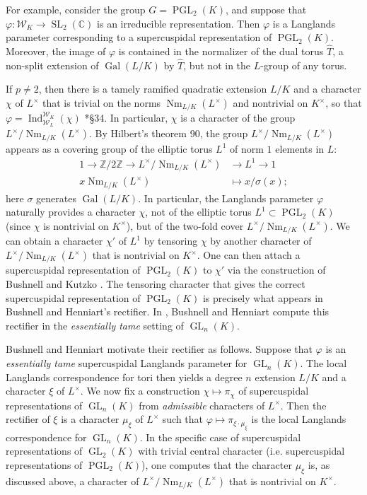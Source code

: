 \documentclass{compositio}
\theoremstyle{plain}
\theoremstyle{definition}
\numberwithin{equation}{section}
\DeclareMathOperator{\Gal}{Gal}
\DeclareMathOperator{\Nm}{Nm}
\DeclareMathOperator{\Ind}{Ind}
\DeclareMathOperator{\GL}{GL}
\DeclareMathOperator{\PGL}{PGL}
\DeclareMathOperator{\SL}{SL}
\newcommand{\CC}{\mathbb{C}}
\newcommand{\Kx}{K^\times}
\newcommand{\Lx}{L^\times}
\newcommand{\Weil}{\mathcal{W}}
\begin{document}
For example, consider the group $G = \PGL_{2}(K)$, and suppose that
$\varphi : \Weil_K \rightarrow \SL_{2}(\CC)$ is an
irreducible representation.  Then $\varphi$ is a Langlands parameter corresponding
to a supercuspidal representation of $\PGL_2(K)$.  Moreover, the image of $\varphi$
is contained in the normalizer of the dual torus $\hat{T}$, a non-split
extension of $\Gal(L/K)$ by $\hat{T}$, but not in the $L$-group of any torus.

If $p \neq 2$, then there is a tamely ramified quadratic
extension $L/K$ and a character
$\chi$ of $\Lx$ that is trivial on the norms $\Nm_{L/K}(\Lx)$ and nontrivial on $\Kx$, so that
$\varphi = \Ind_{\Weil_L}^{\Weil_K}(\chi)$ \cite{bushnell-henniart:06a}*{\S 34}.  In particular, $\chi$ is a character of the group $\Lx / \Nm_{L/K}(\Lx)$.
By Hilbert's theorem 90, the group $\Lx / \Nm_{L/K}(\Lx)$ appears as a covering group of the elliptic torus $L^1$ of norm $1$ elements in $L$:
\begin{align*}
1 \rightarrow \mathbb{Z} / 2 \mathbb{Z} \rightarrow \Lx / \Nm_{L/K}(\Lx) &\rightarrow L^1 \rightarrow 1 \\
x \Nm_{L/K}(L^{\times}) &\mapsto x / \sigma(x);
\end{align*}
here $\sigma$ generates $\Gal(L/K)$.  In particular, the Langlands parameter
$\varphi$ naturally provides a character $\chi$, not of the elliptic torus
$L^1 \subset \PGL_2(K)$ (since $\chi$ is nontrivial on $\Kx$),
but of the two-fold cover $\Lx / \Nm_{L/K}(\Lx)$.  We can obtain a character $\chi'$ of $L^1$
by tensoring $\chi$ by another character of
$\Lx / \Nm_{L/K}(\Lx)$ that is nontrivial on $\Kx$.  One can then attach a supercuspidal representation
of $\PGL_2(K)$ to $\chi'$ via the construction of Bushnell and Kutzko \cite{bushnell-kutzko:AdmissibleDual}.
The tensoring character that gives the correct supercuspidal representation of $\PGL_2(K)$
is precisely what appears in Bushnell and Henniart's rectifier.  In \cite{bushnell-henniart:10a},
Bushnell and Henniart compute this rectifier in the \emph{essentially tame} setting of $\GL_n(K)$.

Bushnell and Henniart motivate their rectifier as follows.
Suppose that $\varphi$ is an \emph{essentially tame} supercuspidal Langlands parameter for
$\GL_n(K)$.  The local Langlands correspondence for tori then yields a degree $n$ extension
$L/K$ and a character $\xi$ of $L^{\times}$.  We now fix a construction $\chi \mapsto \pi_{\chi}$
of supercuspidal representations of $\GL_n(K)$ from \emph{admissible} characters of $L^{\times}$.
Then the rectifier of $\xi$ is a character $\mu_{\xi}$ of $L^{\times}$ such that
$\varphi \mapsto \pi_{\xi \cdot \mu_{\xi}}$ is the local Langlands correspondence for $\GL_n(K)$.
In the specific case of supercuspidal representations of $\GL_2(K)$ with trivial central character
(i.e. supercuspidal representations of $\PGL_2(K)$), one computes that the character $\mu_{\xi}$ is,
as discussed above, a character of $\Lx / \Nm_{L/K}(\Lx)$ that is nontrivial on $\Kx$.
\end{document}
